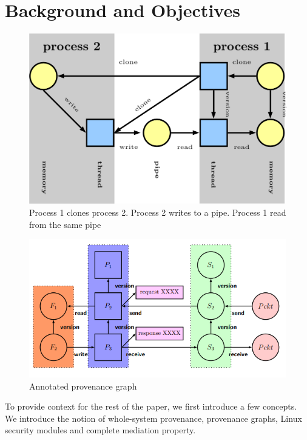 \section{Background and Objectives}
\begin{figure}
	\centering
	\includegraphics[width=0.7\linewidth]{graph}
	\caption[Provenance graph]{Process 1 clones process 2. Process 2 writes to a pipe. Process 1 read from the same pipe}
	\label{fig:graph}
\end{figure}
\begin{figure}
	\centering
	\includegraphics[width=0.7\linewidth]{Annotated-provenance-graph}
	\caption[Provenance graph]{Annotated provenance graph}
	\label{fig:annotated-provenance-graph}
\end{figure}

To provide context for the rest of the paper, we first introduce a few concepts. We introduce the notion of whole-system provenance, provenance graphs, Linux security modules and complete mediation property.


